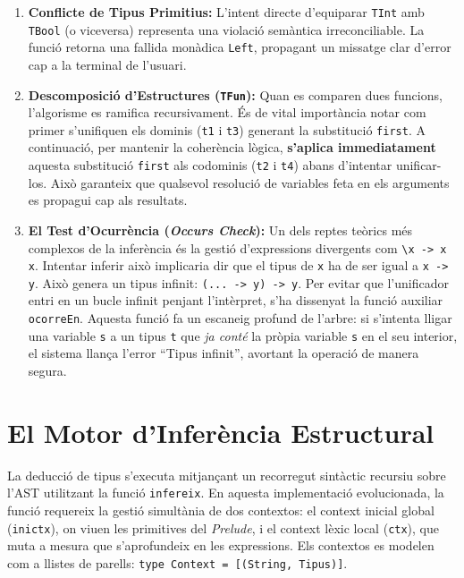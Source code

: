 \begin{enumerate}
    \item \textbf{Conflicte de Tipus Primitius:} L'intent directe d'equiparar \texttt{TInt} amb \texttt{TBool} (o viceversa) representa una violació semàntica irreconciliable. La funció retorna una fallida monàdica \texttt{Left}, propagant un missatge clar d'error cap a la terminal de l'usuari.
    \item \textbf{Descomposició d'Estructures (\texttt{TFun}):} Quan es comparen dues funcions, l'algorisme es ramifica recursivament. És de vital importància notar com primer s'unifiquen els dominis (\texttt{t1} i \texttt{t3}) generant la substitució \texttt{first}. A continuació, per mantenir la coherència lògica, \textbf{s'aplica immediatament} aquesta substitució \texttt{first} als codominis (\texttt{t2} i \texttt{t4}) abans d'intentar unificar-los. Això garanteix que qualsevol resolució de variables feta en els arguments es propagui cap als resultats.
    \item \textbf{El Test d'Ocurrència (\textit{Occurs Check}):} Un dels reptes teòrics més complexos de la inferència és la gestió d'expressions divergents com \texttt{\textbackslash x -> x x}. Intentar inferir això implicaria dir que el tipus de \texttt{x} ha de ser igual a \texttt{x -> y}. Això genera un tipus infinit: \texttt{(... -> y) -> y}. Per evitar que l'unificador entri en un bucle infinit penjant l'intèrpret, s'ha dissenyat la funció auxiliar \texttt{ocorreEn}. Aquesta funció fa un escaneig profund de l'arbre: si s'intenta lligar una variable \texttt{s} a un tipus \texttt{t} que \textit{ja conté} la pròpia variable \texttt{s} en el seu interior, el sistema llança l'error ``Tipus infinit'', avortant la operació de manera segura.
\end{enumerate}


\section{El Motor d'Inferència Estructural}

La deducció de tipus s'executa mitjançant un recorregut sintàctic recursiu sobre l'AST utilitzant la funció \texttt{infereix}. En aquesta implementació evolucionada, la funció requereix la gestió simultània de dos contextos: el context inicial global (\texttt{inictx}), on viuen les primitives del \textit{Prelude}, i el context lèxic local (\texttt{ctx}), que muta a mesura que s'aprofundeix en les expressions. Els contextos es modelen com a llistes de parells: \texttt{type Context = [(String, Tipus)]}.

